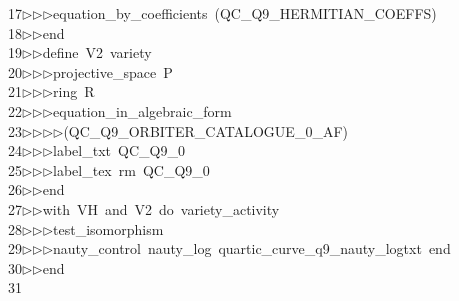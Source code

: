 \begin{tabbing}
17\>$\triangleright$\>$\triangleright$\>$\triangleright$\>equation\_by\_coefficients\ (QC\_Q9\_HERMITIAN\_COEFFS)\ \\[0pt]
18\>$\triangleright$\>$\triangleright$\>end\ \\[0pt]
19\>$\triangleright$\>$\triangleright$\>define\ V2\ variety\ \\[0pt]
20\>$\triangleright$\>$\triangleright$\>$\triangleright$\>projective\_space\ P\ \\[0pt]
21\>$\triangleright$\>$\triangleright$\>$\triangleright$\>ring\ R\ \\[0pt]
22\>$\triangleright$\>$\triangleright$\>$\triangleright$\>equation\_in\_algebraic\_form\ \\[0pt]
23\>$\triangleright$\>$\triangleright$\>$\triangleright$\>$\triangleright$\>(QC\_Q9\_ORBITER\_CATALOGUE\_0\_AF)\ \\[0pt]
24\>$\triangleright$\>$\triangleright$\>$\triangleright$\>label\_txt\ QC\_Q9\_0\ \\[0pt]
25\>$\triangleright$\>$\triangleright$\>$\triangleright$\>label\_tex\ rm\ QC\_Q9\_0\ \\[0pt]
26\>$\triangleright$\>$\triangleright$\>end\ \\[0pt]
27\>$\triangleright$\>$\triangleright$\>with\ VH\ and\ V2\ do\ variety\_activity\ \\[0pt]
28\>$\triangleright$\>$\triangleright$\>$\triangleright$\>test\_isomorphism\ \\[0pt]
29\>$\triangleright$\>$\triangleright$\>$\triangleright$\>nauty\_control\ nauty\_log\ quartic\_curve\_q9\_nauty\_logtxt\ end\ \\[0pt]
30\>$\triangleright$\>$\triangleright$\>end\\[0pt]
31\>\end{tabbing}
